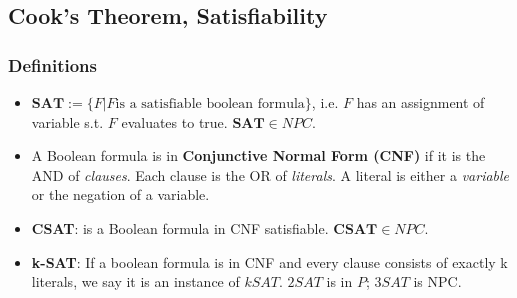 \subsection{\color{ForestGreen}Cook's Theorem, Satisfiability}
\subsubsection{Definitions}
\begin{itemize}
    \item $\mathbf{SAT} := \{F | F \text{is a satisfiable boolean formula}\}$, i.e. $F$ has an assignment of variable s.t. $F$ evaluates to true. $\mathbf{SAT}\in NPC.$
    \item A  Boolean formula is in \textbf{Conjunctive Normal Form (CNF)} if it is the AND of \textit{clauses}. Each clause is the OR of \textit{literals}. A literal is either a \textit{variable} or the negation of a variable.
    \item \textbf{CSAT}: is a Boolean formula in CNF satisfiable.  $\mathbf{CSAT}\in NPC.$
    \item \textbf{k-SAT}: If a boolean formula is in CNF and every clause consists of exactly k literals, we say it is an instance of $kSAT.$ $2SAT$ is in $P$; $3SAT$ is NPC.

\end{itemize}
